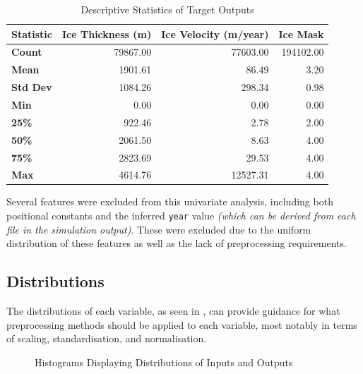 \begin{table}[H]
\centering
\caption{Descriptive Statistics of Target Outputs}
\label{tab:target_outputs_describe}
\scriptsize
\begin{tabular}{lrrr}
\toprule
\textbf{Statistic} & \textbf{Ice Thickness (m)} & \textbf{Ice Velocity (m/year)} & \textbf{Ice Mask} \\ \midrule
\textbf{Count}     & 79867.00    & 77603.00   & 194102.00   \\
\textbf{Mean}      & 1901.61     & 86.49      & 3.20        \\
\textbf{Std Dev}   & 1084.26     & 298.34     & 0.98        \\
\textbf{Min}       & 0.00        & 0.00       & 0.00        \\
\textbf{25\%}      & 922.46      & 2.78       & 2.00        \\
\textbf{50\%}      & 2061.50     & 8.63       & 4.00        \\
\textbf{75\%}      & 2823.69     & 29.53      & 4.00        \\
\textbf{Max}       & 4614.76     & 12527.31   & 4.00        \\ \bottomrule
\end{tabular}
\end{table}

Several features were excluded from this univariate analysis, including both positional constants  and the inferred \texttt{year} value \textit{(which can be derived from each file in the simulation output)}.  These were excluded due to the uniform distribution of these features as well as the lack of preprocessing requirements.

\subsection{Distributions}\label{SS:distributions}

The distributions of each variable, as seen in , can provide guidance for what preprocessing methods should be applied to each variable, most notably in terms of scaling, standardisation, and normalisation.

\begin{figure}[H]
  \centering
  \caption{Histograms Displaying Distributions of Inputs and Outputs}
  \label{fig:distributions}
\end{figure}

